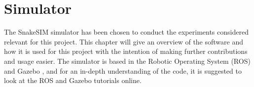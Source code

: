 \chapter{Simulator}\label{chapter:simulator}

The SnakeSIM simulator \cite{sanfilippo2018snakesim} has been chosen to conduct the experiments considered relevant for this project. This chapter will give an overview of the software and how it is used for this project with the intention of making further contributions and usage easier. The simulator is based in the Robotic Operating System (ROS) \cite{quigley2009ros} and Gazebo \cite{koenig2004design}, and for an in-depth understanding of the code, it is suggested to look at the ROS and Gazebo tutorials online.




%
%